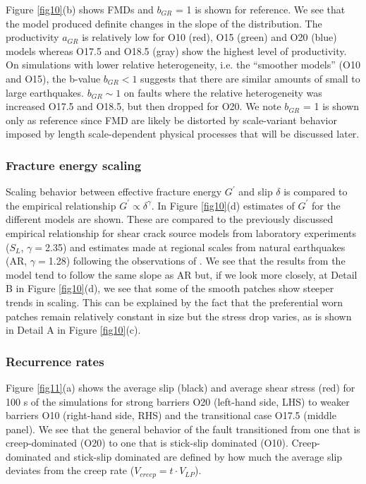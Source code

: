 \documentclass[preprint,1p, 10pt,authoryear]{elsarticle}
\begin{document}
Figure \ref{fig10}(b) shows FMDs and $b_{GR}$ = 1 is shown for reference. We see that the model produced definite changes in the slope of the distribution.  The productivity $a_{GR}$  is relatively low for O10 (red), O15 (green) and O20 (blue) models whereas O17.5 and O18.5 (gray) show the highest level of productivity. On simulations with lower relative heterogeneity, i.e. the ``smoother models'' (O10 and O15), the b-value $b_{GR} < 1$ suggests that there are similar amounts of small to large earthquakes.  $b_{GR} \sim 1$ on faults where the relative heterogeneity was increased O17.5 and O18.5, but then dropped for O20. We note $b_{GR}$ = 1 is shown only as reference since FMD are likely be distorted by scale-variant behavior imposed by length scale-dependent physical processes that will be discussed later.

\subsubsection{Fracture energy scaling}
\label{FracEnergy}
Scaling behavior between effective fracture energy $G^{'}$ and slip $\delta$  is compared to the  empirical relationship $G^{'} \propto \delta^{\gamma}$. In Figure \ref{fig10}(d) estimates of $G^{'}$ for the different models are shown. These are compared to the previously discussed empirical relationship for shear crack source models from laboratory experiments ($S_{L}$, $\gamma = $2.35) \citep{Selvadurai2019}  and estimates made at regional scales from natural earthquakes (AR, $\gamma = $1.28) following the observations of \citet{Abercrombie2005}.  We see that the results from the model tend to follow the same slope as AR but, if we look more closely, at Detail B in Figure \ref{fig10}(d), we see that some of the smooth patches show steeper trends in scaling. This can be explained by the fact that the preferential worn patches remain relatively constant in size but the stress drop varies, as is shown in Detail A in Figure \ref{fig10}(c).

\subsubsection{Recurrence rates}
\label{Recurrence times}
Figure \ref{fig11}(a) shows the average slip (black) and average shear stress (red) for 100 s of the simulations for strong barriers O20 (left-hand side, LHS) to weaker barriers O10 (right-hand side, RHS) and the transitional case O17.5 (middle panel).  We see that the general behavior of the fault transitioned from one that is creep-dominated (O20) to one that is stick-slip dominated (O10). Creep-dominated and stick-slip dominated are defined by how much the average slip deviates from the creep rate ($V_{creep} = t\cdot V_{LP}$). 
\end{document}
